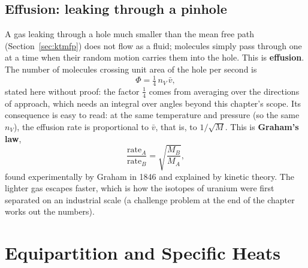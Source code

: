 

\subsection{Effusion: leaking through a pinhole}

A gas leaking through a hole much smaller than the mean free path (Section~\ref{sec:ktmfp}) does not flow
as a fluid; molecules simply pass through one at a time when their random motion carries them into the
hole. This is \textbf{effusion}. The number of molecules crossing unit area of the hole per second is
\[
\Phi = \tfrac14\,n_V\,\bar v ,
\]
stated here without proof: the factor $\tfrac14$ comes from averaging over the directions of approach,
which needs an integral over angles beyond this chapter's scope. Its consequence is easy to read: at the
same temperature and pressure (so the same $n_V$), the effusion rate is proportional to $\bar v$, that is,
to $1/\sqrt{M}$. This is \textbf{Graham's law},
\[
\frac{\text{rate}_A}{\text{rate}_B}=\sqrt{\frac{M_B}{M_A}} ,
\]
found experimentally by Graham in 1846 and explained by kinetic theory. The lighter gas escapes faster,
which is how the isotopes of uranium were first separated on an industrial scale (a challenge problem at
the end of the chapter works out the numbers).

\section{Equipartition and Specific Heats}\label{sec:ktequipartition}

